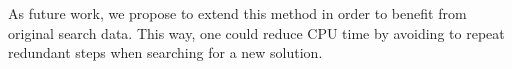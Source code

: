 \documentclass[runningheads]{llncs}
\begin{document}



As future work, we propose to extend this method in order to benefit from original search data. This way, one could reduce CPU time by avoiding to repeat redundant steps when searching for a new solution.
\end{document}
